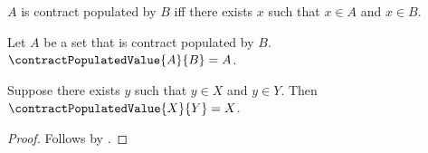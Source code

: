 \begin{abbreviation}\label{contract_populated}
    $A$ is contract populated by $B$ iff there exists $x$ such that $x\in A$ and $x\in B$.
\end{abbreviation}

\begin{definition}\label{contract_populated_value}
    Let $A$ be a set that is contract populated by $B$.
    $\contractPopulatedValue{A}{B}=A$.
\end{definition}

\begin{proposition}\label{contract_populated_consumer}
    Suppose there exists $y$ such that $y\in X$ and $y\in Y$.
    Then $\contractPopulatedValue{X}{Y}=X$.
\end{proposition}
\begin{proof}
    Follows by .
\end{proof}
